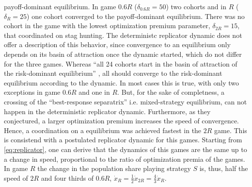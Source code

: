 payoff-dominant equilibrium. 
In game $0.6R$ ($\delta_{0.6R}=50$) two cohorts and in $R$ ($\delta_{R}=25$)
one cohort converged to the payoff-dominant equilibrium. There was no
cohort in the game with the lowest optimization premium parameter, 
$\delta_{2R}= 15$, that coordinated on stag hunting.
The deterministc replicator dynamic does 
not offer a description of this behavior, since convergence to an 
equilibrium only depends on its basin of attraction once the dynamic 
started, which do not differ for the three games. 
Whereas ``all 24 cohorts start in the basin of attraction
of the risk-dominant equilibrium'' 
\parencite[755]{battalio_optimization_2001}, all should converge to the 
risk-dominant equilibrium according to the dynamic.
In most cases this is true, with only two exceptions in game $0.6R$ 
and one in $R$.
But, for the sake of completness, a crossing of the  
``best-response separatrix'' \parencite{battalio_optimization_2001} i.e. 
mixed-strategy equilibrium, can not happen in the deterministic replicator 
dynamic. Furthermore, as they conjectured, a larger optimization premium 
increases the speed of convergence. Hence, a coordination on a equilibrium 
was achieved fastest in the $2R$ game. This is consistend with a 
postulated replicator dynamic for this games. Starting from 
\eqref{eq:replicator}, one can derive that the dynamics of this 
games are the same up to a change in speed, proportional to the ratio of 
optimization premia of the games. In game $R$ the change in the population share
playing strategy $S$ is, thus, half the speed of $2R$ and four thirds of $0.6R$,
$\dot{x}_{R} = \frac 12 \dot{x}_{2R} = \frac{4}{3}\dot{x}_R$.


